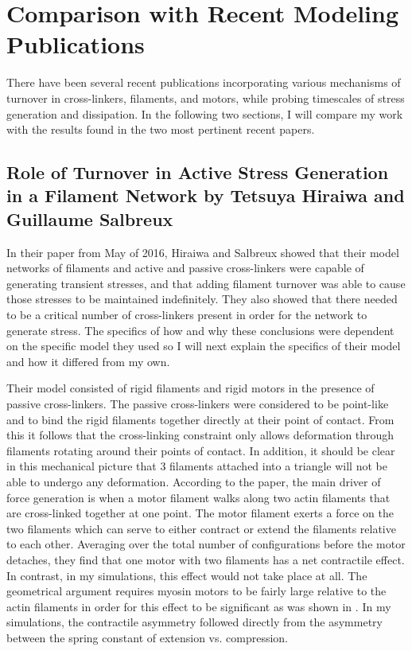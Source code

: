 \section{Comparison with Recent Modeling Publications}
There have been several recent publications incorporating various mechanisms of turnover in cross-linkers, filaments, and motors, while probing timescales of stress generation and dissipation.  In the following two sections, I will compare my work with the results found in the two most pertinent recent papers.

\subsection{Role of Turnover in Active Stress Generation in a Filament Network by Tetsuya Hiraiwa and Guillaume Salbreux}
In their paper from May of 2016, Hiraiwa and Salbreux\cite{2015arXiv150706182H} showed that their model networks of filaments and active and passive cross-linkers were capable of generating transient stresses, and that adding filament turnover was able to cause those stresses to be maintained indefinitely. They also showed that there needed to be a critical number of cross-linkers present in order for the network to generate stress.  The specifics of how and why these conclusions were dependent on the specific model they used so I will next explain the specifics of their model and how it differed from my own.

Their model consisted of rigid filaments and rigid motors in the presence of passive cross-linkers.  The passive cross-linkers were considered to be point-like and to bind the rigid filaments together directly at their point of contact.  From this it follows that the cross-linking constraint only allows deformation through filaments rotating around their points of contact.  In addition, it should be clear in this mechanical picture that 3 filaments attached into a triangle will not be able to undergo any deformation.  According to the paper, the main driver of force generation is when a motor filament walks along two actin filaments that are cross-linked together at one point.  The motor filament exerts a force on the two filaments which can serve to either contract or extend the filaments relative to each other.  Averaging over the total number of configurations before the motor detaches, they find that one motor with two filaments has a net contractile effect.  In contrast, in my simulations, this effect would not take place at all.  The geometrical argument requires myosin motors to be fairly large relative to the actin filaments in order for this effect to be significant as was shown in \cite{PhysRevX.4.041002}.  In my simulations, the contractile asymmetry followed directly from the asymmetry between the spring constant of extension vs. compression.

